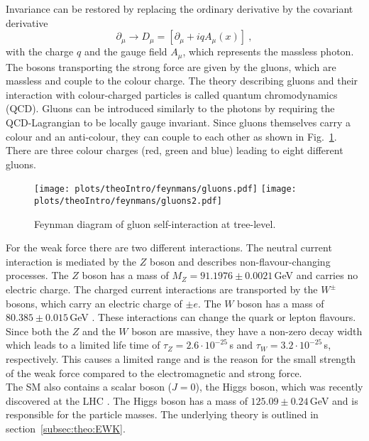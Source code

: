 Invariance can be restored by replacing the ordinary derivative by the covariant derivative
\begin{equation}
\partial_\mu \rightarrow D_\mu = [\partial_\mu + iqA_\mu(x)] ~,
\end{equation}
with the charge $q$ and the gauge field $A_\mu$, which represents the massless photon.\\
The bosons transporting the strong force are given by the gluons, which are massless and couple to the colour charge. The theory describing gluons and their interaction with colour-charged particles is called quantum chromodynamics (QCD). Gluons can be introduced similarly to the photons by requiring the QCD-Lagrangian to be locally gauge invariant. Since gluons themselves carry a colour and an anti-colour, they can couple to each other as shown in Fig.~\ref{fig:theo:gluoncoupling}. There are three colour charges (red, green and blue) leading to eight different gluons.\\
\begin{figure}
	\centering
	\texttt{[image: plots/theoIntro/feynmans/gluons.pdf]}
	\texttt{[image: plots/theoIntro/feynmans/gluons2.pdf]}
	\caption[Feynman diagram of gluon self-interaction at tree-level]{Feynman diagram of gluon self-interaction at tree-level.}
	\label{fig:theo:gluoncoupling}
\end{figure}
For the weak force there are two different interactions. The neutral current interaction is mediated by the $Z$ boson and describes non-flavour-changing processes. The $Z$ boson has a mass of $M_Z=91.1976 \pm 0.0021$\,GeV \cite{SMmasses} and carries no electric charge. The charged current interactions are transported by the $W^\pm$ bosons, which carry an electric charge of $\pm e$. The $W$ boson has a mass of $80.385 \pm 0.015$\,GeV \cite{SMmasses}. These interactions can change the quark or lepton flavours. Since both the $Z$ and the $W$ boson are massive, they have a non-zero decay width which leads to a limited life time of $\tau_Z=2.6\cdot 10^{-25}$\,s and $\tau_W=3.2\cdot 10^{-25}$\,s, respectively. This causes a limited range and is the reason for the small strength of the weak force compared to the electromagnetic and strong force.\\ 
The SM also contains a scalar boson ($J=0$), the Higgs boson, which was recently discovered at the LHC \cite{cms_higgsdiscov,atlas_higgsdiscov}. The Higgs boson has a mass of $125.09 \pm 0.24$\,GeV and is responsible for the particle masses. The underlying theory is outlined in section~\ref{subsec:theo:EWK}.\\

